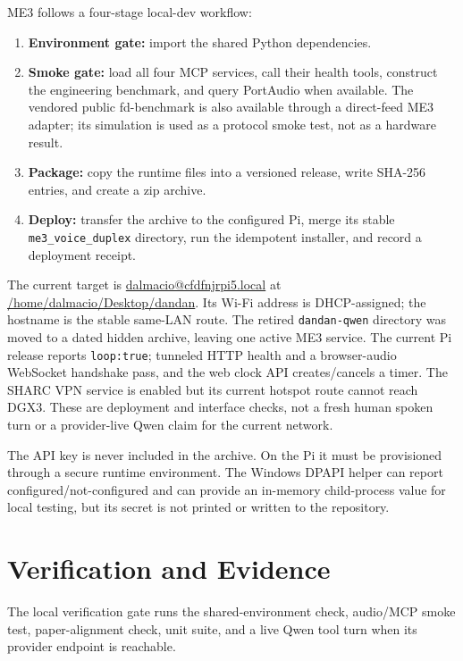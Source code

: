 \documentclass[sigconf,nonacm,balance=false]{acmart}
\begin{document}
ME3 follows a four-stage local-dev workflow:
\begin{enumerate}[leftmargin=*]
\item \textbf{Environment gate:} import the shared Python dependencies.
\item \textbf{Smoke gate:} load all four MCP services, call their health tools,
construct the engineering benchmark, and query PortAudio when available.
The vendored public fd-benchmark is also available through a direct-feed ME3
adapter; its simulation is used as a protocol smoke test, not as a hardware
result.
\item \textbf{Package:} copy the runtime files into a versioned release, write
SHA-256 entries, and create a zip archive.
\item \textbf{Deploy:} transfer the archive to the configured Pi, merge its
stable \texttt{me3\_voice\_duplex} directory, run the idempotent installer,
and record a deployment receipt.
\end{enumerate}

\begin{sloppypar}
The current target is \url{dalmacio@cfdfnjrpi5.local} at
\url{/home/dalmacio/Desktop/dandan}. Its Wi-Fi address is DHCP-assigned; the
hostname is the stable same-LAN route. The retired \texttt{dandan-qwen}
directory was moved to a dated hidden archive, leaving one active ME3 service.
The current Pi release reports \texttt{loop:true}; tunneled HTTP health and a
browser-audio WebSocket handshake pass, and the web clock API creates/cancels
a timer. The SHARC VPN service is enabled but its current hotspot route cannot
reach DGX3. These are deployment and interface checks, not a fresh human spoken
turn or a provider-live Qwen claim for the current network.
\end{sloppypar}

The API key is never included in the archive. On the Pi it must be provisioned
through a secure runtime environment. The Windows DPAPI helper can report
configured/not-configured and can provide an in-memory child-process value for
local testing, but its secret is not printed or written to the repository.

\section{Verification and Evidence}

The local verification gate runs the shared-environment check, audio/MCP smoke
test, paper-alignment check, unit suite, and a live Qwen tool turn when its
provider endpoint is reachable.
\end{document}
